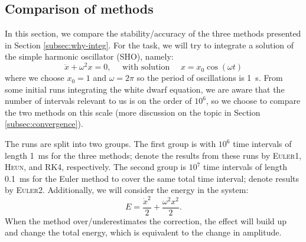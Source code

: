 \documentclass[]{article}
\newcommand{\eulerOne}{\textsc{Euler1}}
\newcommand{\eulerTwo}{\textsc{Euler2}}
\newcommand{\heun}{\textsc{Heun}}
\newcommand{\rkFour}{\textsc{RK4}}
\begin{document}
\subsection{Comparison of methods}
	In this section, we compare the stability/accuracy of the three methods presented in Section \ref{subsec:why-integ}. For the task, we will try to integrate a solution of the simple harmonic oscillator (SHO), namely:
	\begin{equation}
		\ddot{x} + \omega^2 x = 0, \quad \text{ with solution } \quad x = x_0 \cos(\omega t)
	\end{equation}
	where we choose $x_0 = 1$ and $\omega = 2 \pi$ so the period of oscillations is \SI{1}{s}. From some initial runs integrating the white dwarf equation, we are aware that the number of intervals relevant to us is on the order of $10^{6}$, so we choose to compare the two methods on this scale (more discussion on the topic in Section \ref{subsec:convergence}).

	The runs are split into two groups. The first group is with $10^6$ time intervals of length \SI{1}{ms} for the three methods; denote the results from these runs by \eulerOne{}, \heun{}, and \rkFour{}, respectively. The second group is $10^7$ time intervals of length \SI{0.1}{ms} for the Euler method to cover the same total time interval; denote results by \eulerTwo{}. Additionally, we will consider the energy in the system:
	\begin{equation}
		E = \frac{\dot{x}^2}{2} + \frac{\omega^2 x^2}{2}.
	\end{equation}
	When the method over/underestimates the correction, the effect will build up and change the total energy, which is equivalent to the change in amplitude.
\end{document}

